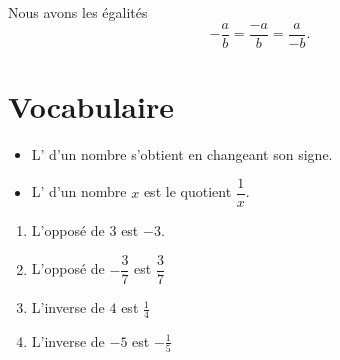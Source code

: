 \begin{remark}
    Nous avons les égalités
    \begin{equation}
        -\frac{ a }{ b }=\frac{ -a }{ b }=\frac{ a }{ -b }.
    \end{equation}
\end{remark}

\section{Vocabulaire}

\begin{definition}
    \begin{itemize}
        \item L' d'un nombre s'obtient en changeant son signe.
        \item L' d'un nombre \( x\) est le quotient \( \dfrac{ 1 }{ x }\).
    \end{itemize}
\end{definition}

\begin{example}
    \begin{enumerate}
        \item
            L'opposé de \( 3\) est \( -3\).
        \item
            L'opposé de \( -\dfrac{ 3 }{ 7 }\) est \( \dfrac{ 3 }{ 7 }\)
        \item
            L'inverse de \( 4\) est \( \frac{1}{ 4 }\)
        \item
            L'inverse de \( -5\) est \( -\frac{1}{ 5 }\)
    \end{enumerate}
\end{example}
